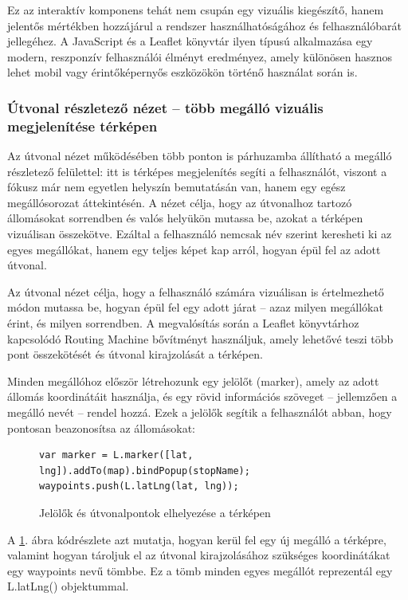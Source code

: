 Ez az interaktív komponens tehát nem csupán egy vizuális kiegészítő, hanem jelentős mértékben hozzájárul a rendszer használhatóságához és felhasználóbarát jellegéhez. A JavaScript és a Leaflet könyvtár ilyen típusú alkalmazása egy modern, reszponzív felhasználói élményt eredményez, amely különösen hasznos lehet mobil vagy érintőképernyős eszközökön történő használat során is.

\subsubsection{Útvonal részletező nézet – több megálló vizuális megjelenítése térképen}

Az útvonal nézet működésében több ponton is párhuzamba állítható a megálló részletező felülettel: itt is térképes megjelenítés segíti a felhasználót, viszont a fókusz már nem egyetlen helyszín bemutatásán van, hanem egy egész megállósorozat áttekintésén. A nézet célja, hogy az útvonalhoz tartozó állomásokat sorrendben és valós helyükön mutassa be, azokat a térképen vizuálisan összekötve. Ezáltal a felhasználó nemcsak név szerint keresheti ki az egyes megállókat, hanem egy teljes képet kap arról, hogyan épül fel az adott útvonal.

Az útvonal nézet célja, hogy a felhasználó számára vizuálisan is értelmezhető módon mutassa be, hogyan épül fel egy adott járat – azaz milyen megállókat érint, és milyen sorrendben. A megvalósítás során a Leaflet könyvtárhoz kapcsolódó Routing Machine bővítményt használjuk, amely lehetővé teszi több pont összekötését és útvonal kirajzolását a térképen.

Minden megállóhoz először létrehozunk egy jelölőt (marker), amely az adott állomás koordinátáit használja, és egy rövid információs szöveget – jellemzően a megálló nevét – rendel hozzá. Ezek a jelölők segítik a felhasználót abban, hogy pontosan beazonosítsa az állomásokat:

\begin{figure}[H]
\caption{Jelölők és útvonalpontok elhelyezése a térképen}
\label{fig:route-markers}
\begin{minipage}{\textwidth}
\begin{BVerbatim}
var marker = L.marker([lat, lng]).addTo(map).bindPopup(stopName);
waypoints.push(L.latLng(lat, lng));
\end{BVerbatim}
\end{minipage}
\end{figure}

A \ref{fig:route-markers}. ábra kódrészlete azt mutatja, hogyan kerül fel egy új megálló a térképre, valamint hogyan tároljuk el az útvonal kirajzolásához szükséges koordinátákat egy waypoints nevű tömbbe. Ez a tömb minden egyes megállót reprezentál egy L.latLng() objektummal.

